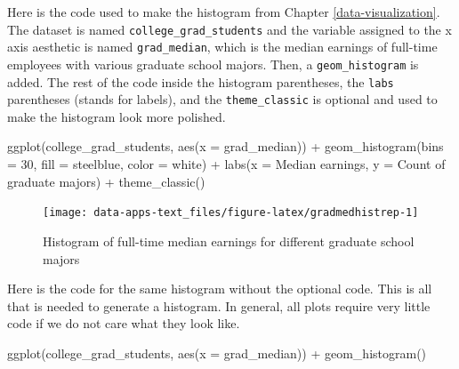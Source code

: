 \documentclass[
]{book}
\makeatletter
\newenvironment{Shaded}{\begin{snugshade}}{\end{snugshade}}
\newcommand{\AttributeTok}[1]{\textcolor[rgb]{0.61,0.61,0.61}{#1}}
\newcommand{\DecValTok}[1]{\textcolor[rgb]{0.06,0.06,0.06}{#1}}
\newcommand{\FunctionTok}[1]{\textcolor[rgb]{0,0,0}{#1}}
\newcommand{\NormalTok}[1]{#1}
\newcommand{\SpecialCharTok}[1]{\textcolor[rgb]{0,0,0}{#1}}
\newcommand{\StringTok}[1]{\textcolor[rgb]{0.5,0.5,0.5}{#1}}
\newenvironment{kframe}{%
\medskip{}
\setlength{\fboxsep}{.8em}
 \def\at@end@of@kframe{}%
 \ifinner\ifhmode%
  \def\at@end@of@kframe{\end{minipage}}%
  \begin{minipage}{\columnwidth}%
 \fi\fi%
 \def\FrameCommand##1{\hskip\@totalleftmargin \hskip-\fboxsep
 \colorbox{shadecolor}{##1}\hskip-\fboxsep
     \hskip-\linewidth \hskip-\@totalleftmargin \hskip\columnwidth}%
 \MakeFramed {\advance\hsize-\width
   \@totalleftmargin\z@ \linewidth\hsize
   \@setminipage}}%
 {\par\unskip\endMakeFramed%
 \at@end@of@kframe}
\renewenvironment{Shaded}{\begin{kframe}}{\end{kframe}}
\makeatother
\begin{document}
Here is the code used to make the histogram from Chapter \ref{data-visualization}. The dataset is named \texttt{college\_grad\_students} and the variable assigned to the x axis aesthetic is named \texttt{grad\_median}, which is the median earnings of full-time employees with various graduate school majors. Then, a \texttt{geom\_histogram} is added. The rest of the code inside the histogram parentheses, the \texttt{labs} parentheses (stands for labels), and the \texttt{theme\_classic} is optional and used to make the histogram look more polished.

\begin{Shaded}
\begin{Highlighting}[]
\FunctionTok{ggplot}\NormalTok{(college\_grad\_students, }\FunctionTok{aes}\NormalTok{(}\AttributeTok{x =}\NormalTok{ grad\_median)) }\SpecialCharTok{+}
  \FunctionTok{geom\_histogram}\NormalTok{(}\AttributeTok{bins =} \DecValTok{30}\NormalTok{, }\AttributeTok{fill =} \StringTok{\textquotesingle{}steelblue\textquotesingle{}}\NormalTok{, }\AttributeTok{color =} \StringTok{\textquotesingle{}white\textquotesingle{}}\NormalTok{) }\SpecialCharTok{+}
  \FunctionTok{labs}\NormalTok{(}\AttributeTok{x =} \StringTok{\textquotesingle{}Median earnings\textquotesingle{}}\NormalTok{, }\AttributeTok{y =} \StringTok{\textquotesingle{}Count of graduate majors\textquotesingle{}}\NormalTok{) }\SpecialCharTok{+}
  \FunctionTok{theme\_classic}\NormalTok{()}
\end{Highlighting}
\end{Shaded}

\begin{figure}

{\centering \texttt{[image: data-apps-text\_files/figure-latex/gradmedhistrep-1]} 

}

\caption{Histogram of full-time median earnings for different graduate school majors}\label{fig:gradmedhistrep}
\end{figure}

Here is the code for the same histogram without the optional code. This is all that is needed to generate a histogram. In general, all plots require very little code if we do not care what they look like.

\begin{Shaded}
\begin{Highlighting}[]
\FunctionTok{ggplot}\NormalTok{(college\_grad\_students, }\FunctionTok{aes}\NormalTok{(}\AttributeTok{x =}\NormalTok{ grad\_median)) }\SpecialCharTok{+}
  \FunctionTok{geom\_histogram}\NormalTok{()}
\end{Highlighting}
\end{Shaded}
\end{document}
